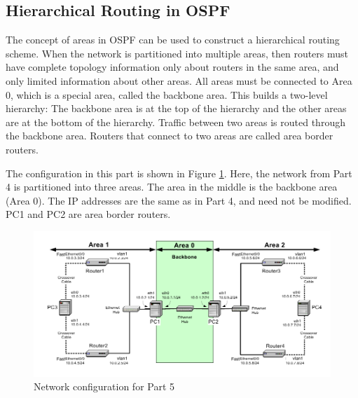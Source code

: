 \begin{questions}
\end{questions}

\newpage
\subsection{Hierarchical Routing in OSPF}

The concept of areas in OSPF can be used to construct a hierarchical routing scheme. When the network is partitioned into multiple areas, then routers must have complete topology information only about routers in the same area, and only limited information about other areas. All areas must be connected to Area 0, which is a special area, called the backbone area. This builds a two-level hierarchy: The backbone area is at the top of the hierarchy and the other areas are at the bottom of the hierarchy. Traffic between two areas is routed through the backbone area. Routers that connect to two areas are called area border routers.

The configuration in this part is shown in Figure \ref{fig:lab4-network2-part5}. Here, the network from Part 4 is partitioned into three areas. The area in the middle is the backbone area (Area 0). The IP addresses are the same as in Part 4, and need not be modified. PC1 and PC2 are area border routers.

\begin{figure}[h!t]
	\centering
	\includegraphics[width=\linewidth]{graphics/lab4-network2-part5-updated.pdf}	
	\caption{Network configuration for Part 5}
	\label{fig:lab4-network2-part5}
\end{figure}

